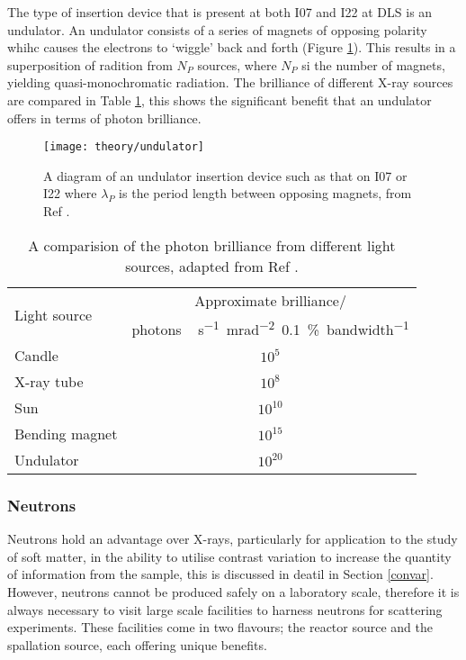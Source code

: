 The type of insertion device that is present at both I07 and I22 at DLS is an undulator. An undulator consists of a series of magnets of opposing polarity whihc causes the electrons to `wiggle' back and forth (Figure \ref{fig:undulator}). This results in a superposition of radition from $N_P$ sources, where $N_P$ si the number of magnets, yielding quasi-monochromatic radiation. The brilliance of different X-ray sources are compared in Table \ref{tab:sources}, this shows the significant benefit that an undulator offers in terms of photon brilliance.
%
\begin{figure}
	\centering
	\texttt{[image: theory/undulator]}
	\caption{A diagram of an undulator insertion device such as that on I07 or I22 where $\lambda_P$ is the period length between opposing magnets, from Ref \cite{Garcia-Gutierrez2009}.}
	\label{fig:undulator}
\end{figure}
%
%
\begin{table}
	\centering
	\caption{A comparision of the photon brilliance from different light sources, adapted from Ref \cite{Sivia2011}.}
	\label{tab:sources}
	\begin{tabular}{l | c}
		\toprule
		\multirow{2}{*}{Light source } & Approximate brilliance/ \\
 & \si{photons\,\second^{-1}\milli\radian^{-2}{0.1}\percent bandwidth^{-1}} \\
		\midrule
		Candle & $10^5$ \\
		X-ray tube & $10^8$ \\
		Sun & $10^{10}$ \\
		Bending magnet & $10^{15}$ \\
		Undulator & $10^{20}$ \\
		\bottomrule
	\end{tabular}
\end{table}

\subsubsection{Neutrons}

Neutrons hold an advantage over X-rays, particularly for application to the study of soft matter, in the ability to utilise contrast variation to increase the quantity of information from the sample, this is discussed in deatil in Section \ref{convar}. However, neutrons cannot be produced safely on a laboratory scale, therefore it is always necessary to visit large scale facilities to harness neutrons for scattering experiments. These facilities come in two flavours; the reactor source and the spallation source, each offering unique benefits.

